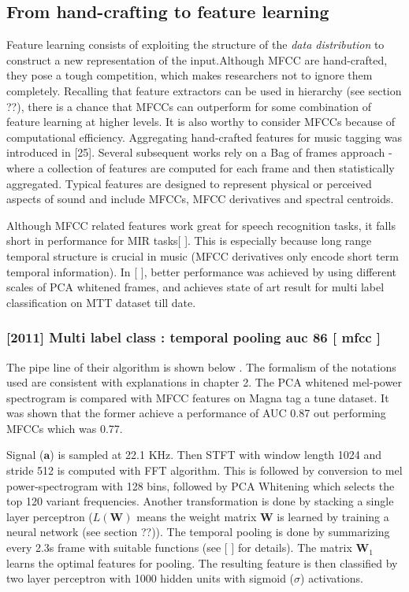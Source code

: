 \subsection{From hand-crafting to feature learning}
 
Feature learning consists of exploiting the structure of the \textit{data distribution} to construct a new representation of the input.Although MFCC are hand-crafted, they pose a tough competition, which makes researchers not to ignore them completely. Recalling that feature extractors can be used in hierarchy (see section ??), there is a chance that MFCCs can outperform for some combination of feature learning at higher levels. It is also worthy to consider MFCCs because of computational efficiency. Aggregating hand-crafted features for music tagging was introduced in [25]. Several subsequent works rely on a Bag of frames approach - where a collection of features are computed for each frame and then statistically aggregated. Typical features are designed to represent physical or perceived aspects of sound and include MFCCs, MFCC derivatives and spectral centroids.
\bigskip

\noindent Although MFCC related features work great for speech recognition tasks, it falls short in performance for MIR tasks[ ]. This is especially because long range temporal structure is crucial in music (MFCC derivatives only encode short term temporal information). In [ ], better performance was achieved by using different scales of PCA whitened frames, and achieves state of art result for multi label classification on MTT dataset till date.


\subsubsection{[2011] Multi label class : temporal pooling auc 86  [ mfcc ]}

The pipe line of their algorithm is shown below . The formalism of the notations used are consistent with explanations in chapter 2. The PCA whitened mel-power spectrogram is compared with MFCC features on Magna tag a tune dataset. It was shown that the former achieve a performance of AUC 0.87 out performing MFCCs which was 0.77.  
\bigskip

\noindent Signal ($\textbf{a}$) is sampled at 22.1 KHz. Then STFT with window length 1024 and stride 512 is computed with FFT algorithm. This is followed by conversion to mel power-spectrogram with 128 bins, followed by PCA Whitening which selects the top 120 variant frequencies. Another transformation is done by stacking a single layer perceptron ($L(\textbf{W})$ means the weight matrix $\textbf{W}$ is learned by training a neural network (see section ??)). The temporal pooling is done by summarizing every 2.3s frame with suitable functions (see [ ] for details). The matrix $\textbf{W}_{1}$ learns the optimal features for pooling. The resulting feature is then classified by two layer perceptron with 1000 hidden units with sigmoid ($\sigma$) activations.

